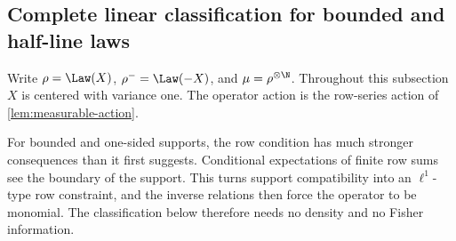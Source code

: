 \subsection{Complete linear classification for bounded and half-line laws}
\label{sec:restricted-support-rigidity}

Write \(\rho=\Law(X)\), \(\rho^-=\Law(-X)\), and
\(\mu=\rho^{\otimes\N}\).
Throughout this subsection \(X\) is centered with variance one.
The operator action is the row-series action of
\cref{lem:measurable-action}.

For bounded and one-sided supports, the row condition has much stronger
consequences than it first suggests.
Conditional expectations of finite row sums see the boundary of the support.
This turns support compatibility into an \(\ell^1\)-type row constraint, and
the inverse relations then force the operator to be monomial.
The classification below therefore needs no density and no Fisher
information.


